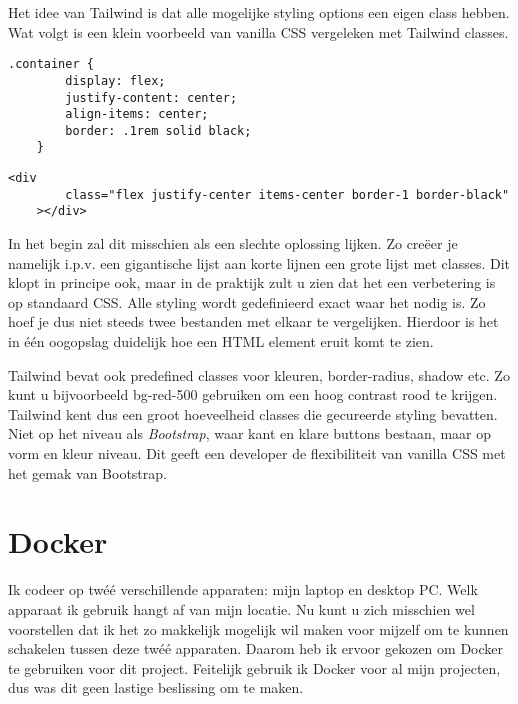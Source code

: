 \documentclass[a4paper]{report}
\begin{document}
    Het idee van Tailwind is dat alle mogelijke styling options een eigen class hebben. Wat volgt is een klein voorbeeld van vanilla CSS vergeleken met Tailwind classes.
    \begin{lstlisting}[caption={Een Flexbox container met een zwarte rand in vanilla CSS}, label=useless, style=css]
    .container {
        display: flex;
        justify-content: center;
        align-items: center;
        border: .1rem solid black;
    }
    \end{lstlisting}
    \begin{lstlisting}[caption={Dezelfde container geschreven in Tailwind}, label=useless, style=css]
    <div
        class="flex justify-center items-center border-1 border-black"
    ></div>
    \end{lstlisting}

    In het begin zal dit misschien als een slechte oplossing lijken. Zo creëer je namelijk i.p.v. een gigantische lijst aan korte lijnen een grote lijst met classes.
    Dit klopt in principe ook, maar in de praktijk zult u zien dat het een verbetering is op standaard CSS. Alle styling wordt gedefinieerd exact waar het nodig is.
    Zo hoef je dus niet steeds twee bestanden met elkaar te vergelijken. Hierdoor is het in één oogopslag duidelijk hoe een HTML element eruit komt te zien.

    Tailwind bevat ook predefined classes voor kleuren, border-radius, shadow etc. Zo kunt u bijvoorbeeld {\selectfont bg-red-500} gebruiken
    om een hoog contrast rood te krijgen. Tailwind kent dus een groot hoeveelheid classes die gecureerde styling bevatten. Niet op het niveau als
    \textit{Bootstrap}, waar kant en klare buttons bestaan, maar op vorm en kleur niveau. Dit geeft een developer de flexibiliteit van vanilla CSS
    met het gemak van Bootstrap.

    \section{Docker}
    Ik codeer op twéé verschillende apparaten: mijn laptop en desktop PC. Welk apparaat ik gebruik hangt af van mijn locatie.
    Nu kunt u zich misschien wel voorstellen dat ik het zo makkelijk mogelijk wil maken voor mijzelf om te kunnen schakelen tussen deze twéé apparaten.
    Daarom heb ik ervoor gekozen om Docker te gebruiken voor dit project. Feitelijk gebruik ik Docker voor al mijn projecten, dus was dit geen lastige beslissing om te maken.
\end{document}
